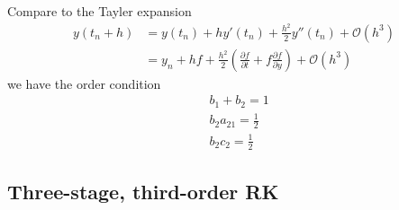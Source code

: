 \documentclass[prd,aps,a4paper,superscriptaddress,onecolumn,footinbib]{revtex4}
\begin{document}
Compare to the Tayler expansion
\begin{align}
    y(t_n+h)
    &=y(t_n) + hy'(t_n) + \frac{h^2}{2}y''(t_n)
    + \mathcal{O}(h^3)
    \\
    &=y_n + h f + \frac{h^2}{2} \left(\frac{\partial f}{\partial t}+f\frac{\partial f}{\partial y}\right)
    + \mathcal{O}(h^3)
\end{align}
we have the order condition
\begin{align}
    &b_1+b_2 = 1 \\
    &b_2a_{21} = \frac{1}{2} \\
    &b_2c_2 = \frac{1}{2}
\end{align}

\subsection{Three-stage, third-order RK}






%
%
\end{document}
